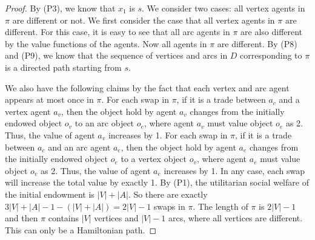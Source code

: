 \begin{proof}


 By (P3), we know that $x_1$ is $s$. We consider two cases: all vertex agents in $\pi$ are different or not.
 We first consider the case that all vertex agents in $\pi$ are different. For this case, it is easy to see that all arc
 agents in $\pi$ are also different by the value functions of the agents.
 Now all agents in $\pi$ are different. By (P8) and (P9), we know that the sequence of vertices and arcs in $D$ corresponding to $\pi$ is a directed path starting from $s$.

 We also have the following claims by the fact that each vertex and arc agent appears at most once in $\pi$. For each swap in $\pi$, if it is a trade between $a_c$ and a vertex agent $a_v$,
then the object hold by agent $a_v$ changes from the initially endowed object $o_v$ to an arc object $o_e$, where agent $a_v$ must value object $o_e$ as 2.
Thus, the value of agent $a_v$ increases by 1.
For each swap in $\pi$, if it is a trade between $a_c$ and an arc agent $a_e$,
then the object hold by agent $a_e$ changes from the initially endowed object $o_e$ to a vertex object $o_v$, where agent $a_e$ must value object $o_v$ as 2.
Thus, the value of agent $a_e$ increases by 1. In any case, each swap will increase the total value by exactly 1.
By (P1), the utilitarian social welfare of the initial endowment is $|V|+|A|$. So there are exactly $3|V|+|A|-1-(|V|+|A|)=2|V|-1$
swaps in $\pi$. The length of $\pi$ is  $2|V|-1$ and then $\pi$ contains $|V|$ vertices and $|V|-1$ arcs, where all vertices are different. This can only be a Hamiltonian path.



\end{proof}
